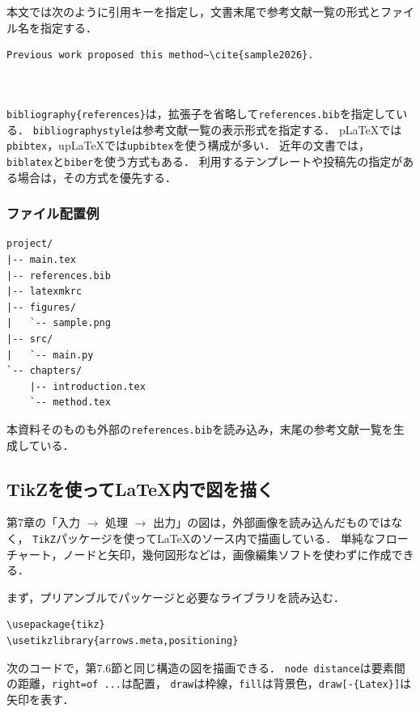 \documentclass[a4paper,11pt]{jsarticle}
\newcommand{\code}[1]{\texttt{#1}}
\begin{document}
本文では次のように引用キーを指定し，文書末尾で参考文献一覧の形式とファイル名を指定する．

\begin{lstlisting}[language={[LaTeX]TeX}]
Previous work proposed this method~\cite{sample2026}.



\end{lstlisting}

\clearpage
\code{bibliography\{references\}}は，拡張子を省略して\code{references.bib}を指定している．
\code{bibliographystyle}は参考文献一覧の表示形式を指定する．
pLaTeXでは\code{pbibtex}，upLaTeXでは\code{upbibtex}を使う構成が多い．
近年の文書では，\code{biblatex}と\code{biber}を使う方式もある．
利用するテンプレートや投稿先の指定がある場合は，その方式を優先する\cite{overleaf-bibliographies}．

\subsubsection{ファイル配置例}

\begin{lstlisting}
project/
|-- main.tex
|-- references.bib
|-- latexmkrc
|-- figures/
|   `-- sample.png
|-- src/
|   `-- main.py
`-- chapters/
    |-- introduction.tex
    `-- method.tex
\end{lstlisting}

本資料そのものも外部の\code{references.bib}を読み込み，末尾の参考文献一覧を生成している．

\subsection{TikZを使ってLaTeX内で図を描く}

第7章の「入力 $\rightarrow$ 処理 $\rightarrow$ 出力」の図は，外部画像を読み込んだものではなく，
\code{TikZ}パッケージを使ってLaTeXのソース内で描画している．
単純なフローチャート，ノードと矢印，幾何図形などは，画像編集ソフトを使わずに作成できる\cite{pgf-tikz-manual}．

まず，プリアンブルでパッケージと必要なライブラリを読み込む．

\begin{lstlisting}[language={[LaTeX]TeX}]
\usepackage{tikz}
\usetikzlibrary{arrows.meta,positioning}
\end{lstlisting}

次のコードで，第7.6節と同じ構造の図を描画できる．
\code{node distance}は要素間の距離，\code{right=of ...}は配置，
\code{draw}は枠線，\code{fill}は背景色，\code{draw[-\{Latex\}]}は矢印を表す．
\end{document}
